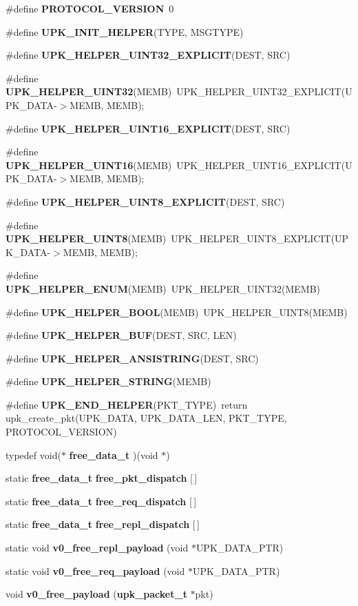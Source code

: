 \begin{DoxyCompactItemize}
\item 
\#define {\bf PROTOCOL\_\-VERSION}~0
\item 
\#define {\bf UPK\_\-INIT\_\-HELPER}(TYPE, MSGTYPE)
\item 
\#define {\bf UPK\_\-HELPER\_\-UINT32\_\-EXPLICIT}(DEST, SRC)
\item 
\#define {\bf UPK\_\-HELPER\_\-UINT32}(MEMB)~UPK\_\-HELPER\_\-UINT32\_\-EXPLICIT(UPK\_\-DATA-\/$>$MEMB, MEMB);
\item 
\#define {\bf UPK\_\-HELPER\_\-UINT16\_\-EXPLICIT}(DEST, SRC)
\item 
\#define {\bf UPK\_\-HELPER\_\-UINT16}(MEMB)~UPK\_\-HELPER\_\-UINT16\_\-EXPLICIT(UPK\_\-DATA-\/$>$MEMB, MEMB);
\item 
\#define {\bf UPK\_\-HELPER\_\-UINT8\_\-EXPLICIT}(DEST, SRC)
\item 
\#define {\bf UPK\_\-HELPER\_\-UINT8}(MEMB)~UPK\_\-HELPER\_\-UINT8\_\-EXPLICIT(UPK\_\-DATA-\/$>$MEMB, MEMB);
\item 
\#define {\bf UPK\_\-HELPER\_\-ENUM}(MEMB)~UPK\_\-HELPER\_\-UINT32(MEMB)
\item 
\#define {\bf UPK\_\-HELPER\_\-BOOL}(MEMB)~UPK\_\-HELPER\_\-UINT8(MEMB)
\item 
\#define {\bf UPK\_\-HELPER\_\-BUF}(DEST, SRC, LEN)
\item 
\#define {\bf UPK\_\-HELPER\_\-ANSISTRING}(DEST, SRC)
\item 
\#define {\bf UPK\_\-HELPER\_\-STRING}(MEMB)
\item 
\#define {\bf UPK\_\-END\_\-HELPER}(PKT\_\-TYPE)~return upk\_\-create\_\-pkt(UPK\_\-DATA, UPK\_\-DATA\_\-LEN, PKT\_\-TYPE, PROTOCOL\_\-VERSION)
\item 
typedef void($\ast$ {\bf free\_\-data\_\-t} )(void $\ast$)
\item 
static {\bf free\_\-data\_\-t} {\bf free\_\-pkt\_\-dispatch} [$\,$]
\item 
static {\bf free\_\-data\_\-t} {\bf free\_\-req\_\-dispatch} [$\,$]
\item 
static {\bf free\_\-data\_\-t} {\bf free\_\-repl\_\-dispatch} [$\,$]
\item 
static void {\bf v0\_\-free\_\-repl\_\-payload} (void $\ast$UPK\_\-DATA\_\-PTR)
\item 
static void {\bf v0\_\-free\_\-req\_\-payload} (void $\ast$UPK\_\-DATA\_\-PTR)
\item 
void {\bf v0\_\-free\_\-payload} ({\bf upk\_\-packet\_\-t} $\ast$pkt)
\item 

\end{DoxyCompactItemize}
